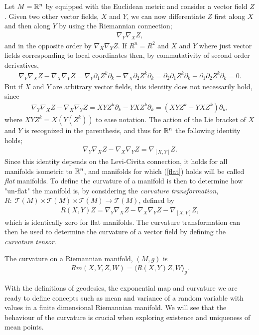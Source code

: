 Let $M = \mathbb{R}^n$ by equipped with the Euclidean metric and consider a vector field $Z$. Given two other vector fields, $X$ and $Y$, we can now differentiate $Z$ first along $X$ and then along $Y$ by using the Riemannian connection;
\begin{align*}
\nabla_Y \nabla_X Z,
\end{align*}
and in the opposite order by $\nabla_X \nabla_Y Z$. If $R^n = R^2$ and $X$ and $Y$ where just vector fields corresponding to local coordinates then, by commutativity of second order derivatives,
\begin{align*}
\nabla_Y \nabla_X Z - \nabla_X \nabla_Y Z = \nabla_Y \partial_1 Z^k \partial_k - \nabla_X \partial_2 Z^k \partial_k = \partial_2 \partial_1 Z^k \partial_k - \partial_1 \partial_2 Z^k \partial_k = 0.
\end{align*}
But if $X$ and $Y$ are arbitrary vector fields, this identity does not necessarily hold, since
\begin{align*}
\nabla_Y \nabla_X Z - \nabla_X \nabla_Y Z = XYZ^k \partial_k - YXZ^k \partial_k = (XYZ^k - YXZ^k)\partial_k,
\end{align*}
where $XYZ^k = X \left( Y \left( Z^k \right) \right)$ to ease notation. The action of the Lie bracket of $X$ and $Y$ is recognized in the parenthesis, and thus for $\mathbb{R}^n$ the following identity holds;
\begin{align}\label{flat}
\nabla_Y \nabla_X Z - \nabla_X \nabla_Y Z = \nabla_{[X,Y]} Z.
\end{align}
Since this identity depends on the Levi-Civita connection, it holds for all manifolds isometric to $\mathbb{R}^n$, and manifolds for which (\ref{flat}) holds will be called \textit{flat} manifolds. To define the curvature of a manifold is then to determine how "un-flat" the manifold is, by considering the \textit{curvature transformation}, $R: \; \mathcal{T}(M) \times \mathcal{T}(M) \times \mathcal{T}(M) \rightarrow \mathcal{T}(M)$, defined by
\begin{align*}
R(X,Y)Z =  \nabla_Y \nabla_X Z - \nabla_X \nabla_Y Z - \nabla_{[X,Y]} Z,
\end{align*}
which is identically zero for flat manifolds. The curvature transformation can then be used to determine the curvature of a vector field by defining the \textit{curvature tensor}.

\begin{definition}
The curvature on a Riemannian manifold, $(M, g)$ is
\begin{align*}
Rm(X,Y,Z,W) = \langle R(X,Y)Z, W \rangle_g.
\end{align*}
\end{definition}

With the definitions of geodesics, the exponential map and curvature we are ready to define concepts such as mean and variance of a random variable with values in a finite dimensional Riemannian manifold. We will see that the behaviour of the curvature is crucial when exploring existence and uniqueness of mean points.




